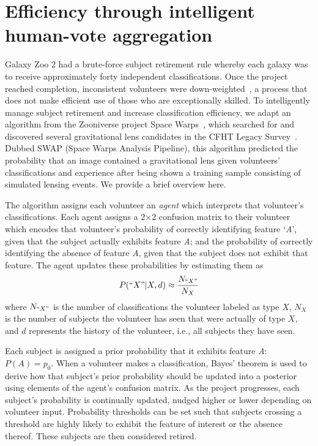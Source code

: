 \documentclass[twocolumn]{aastex6}
\newcommand{\A}{\textit{A}}
\begin{document}
\section{Efficiency through intelligent human-vote aggregation}\label{sec: SWAP}

Galaxy Zoo 2 had a brute-force subject retirement rule whereby each galaxy 
was to receive approximately forty independent classifications. 
Once the project reached completion, inconsistent volunteers were down-weighted~\citep{Willett2013}, 
a process that does not make efficient use of those who are exceptionally skilled. 
To intelligently manage subject retirement and increase classification efficiency, 
we adapt an algorithm from the Zooniverse project Space Warps~\citep{Marshall2016}, 
which searched for and discovered several gravitational lens candidates in the 
CFHT Legacy Survey~\citep{More2016}.  
Dubbed SWAP (Space Warps Analysis Pipeline),  this algorithm predicted the 
probability that an image contained a gravitational lens given 
volunteers' classifications and experience after being shown a training
sample consisting of simulated lensing events.  We provide a brief overview here.  

The algorithm assigns each volunteer an \textit{agent} which interprets that volunteer's 
classifications. Each agent assigns a 2$\times$2 confusion matrix to their volunteer which encodes
that volunteer's probability of correctly identifying feature `\A',  given that the subject 
actually exhibits feature \A; and the probability of correctly identifying
the absence of feature \A, given that the subject does not exhibit 
that feature. The agent updates these probabilities by estimating them as 
\begin{equation}
P(``X" | X, d) \approx \frac{N_{``X"}}{N_{X}}
\end{equation}
where $N_{``X"}$ is the number of classifications the volunteer labeled as type $X$, 
$N_X$ is the number of subjects the volunteer has seen that were actually of type $X$,
and $d$ represents the history of the volunteer, i.e., all subjects they have seen. 


Each subject is assigned a prior probability that it exhibits feature \A: $P(A) = p_0$. 
When a volunteer makes a classification, Bayes' theorem is used to derive how 
that subject's prior probability should be updated into a posterior using elements
of the agent's confusion matrix. 
As the project progresses, each subject's probability is continually updated,
 nudged higher or lower depending on volunteer input.
Probability thresholds can be set such that subjects crossing a threshold
are highly likely to exhibit the feature of interest or the absence thereof. 
These subjects are then considered retired. 
\end{document}
